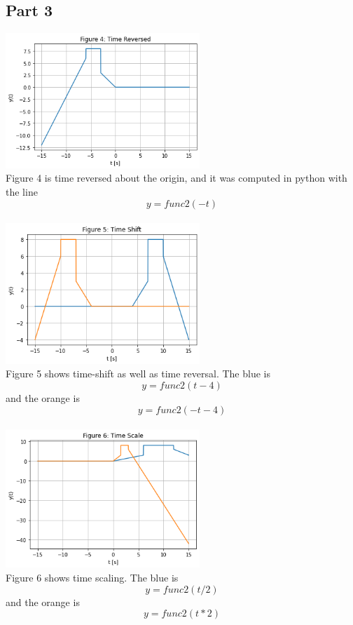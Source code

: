 \documentclass[12pt,a4paper]{article}
\begin{document}
\subsection*{Part 3}
\includegraphics[width=0.55\textwidth]{Figure4.png}\\
Figure 4 is time reversed about the origin, and it was computed in python with the line \[y = func2(-t)\]\\

\includegraphics[width=0.55\textwidth]{Figure5.png}\\
Figure 5 shows time-shift as well as time reversal. The blue is \[y = func2(t-4)\] and the orange is \[y = func2(-t-4)\]\\

\includegraphics[width=0.55\textwidth]{Figure6.png}\\
Figure 6 shows time scaling. The blue is \[y = func2(t/2)\] and the orange is \[y = func2(t*2)\]\\
\end{document}
